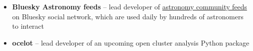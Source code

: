 \begin{itemize}
    \item \textbf{Bluesky Astronomy feeds} -- lead developer of \href{https://github.com/emilyhunt/bluesky-astronomy-feeds}{astronomy community feeds} on Bluesky social network, which are used daily by hundreds of astronomers to interact
    \item \textbf{ocelot} -- lead developer of an upcoming open cluster analysis Python package
\end{itemize}